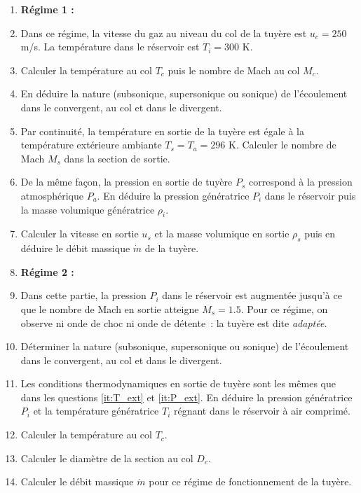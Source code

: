 \begin{enumerate}
\setcounter{enumi}{0}
\item[]
\textbf{R\'egime 1 :}
\item[]
Dans ce r\'egime, la vitesse du gaz au niveau du col de la tuy\`ere
est $u_c = 250$ m/s.
La temp\'erature dans le r\'eservoir est $T_i = 300$ K.
\item
Calculer la temp\'erature au col $T_c$
puis le nombre de Mach au col $M_c$.
\item
En d\'eduire la nature (subsonique, supersonique ou sonique)
de l'\'ecoulement dans le convergent, au col et dans le divergent.
\item
\label{it:T_ext}
Par continuit\'e, la temp\'erature en sortie de la tuy\`ere est \'egale
\`a la temp\'erature ext\'erieure ambiante $T_s = T_a = 296$ K.
Calculer le nombre de Mach $M_s$ dans la section de sortie.
\item
\label{it:P_ext}
De la m\^eme fa\c{c}on, la pression en sortie de tuy\`ere $P_s$ correspond
\`a la pression atmosph\'erique $P_a$.
En d\'eduire la pression g\'en\'eratrice $P_i$ dans le r\'eservoir
puis la masse volumique g\'en\'eratrice $\rho_i$.
\item
Calculer la vitesse en sortie $u_s$ et la masse volumique en sortie $\rho_s$
puis en d\'eduire le d\'ebit massique $\dot{m}$ de la tuy\`ere.
\item[]
\textbf{R\'egime 2 :}
\item[]
Dans cette partie, la pression $P_i$ dans le r\'eservoir est augment\'ee
jusqu'\`a ce que le nombre de Mach en sortie atteigne $M_s = 1.5$.
Pour ce r\'egime, on observe ni onde de choc ni onde de d\'etente~:
la tuy\`ere est dite \textit{adapt\'ee}.
\item
D\'eterminer la nature (subsonique, supersonique ou sonique)
de l'\'ecoulement dans le convergent, au col et dans le divergent.
\item
Les conditions thermodynamiques en sortie de tuy\`ere sont les m\^emes
que dans les questions \ref{it:T_ext} et \ref{it:P_ext}.
En d\'eduire la pression g\'en\'eratrice $P_i$ et la temp\'erature
g\'en\'eratrice $T_i$ r\'egnant dans le r\'eservoir \`a air comprim\'e.
\item
	Calculer la temp\'erature au col $T_c$.
\item
	Calculer le diam\`etre de la section au col $D_c$.
\item
	Calculer le d\'ebit massique $\dot{m}$ pour ce r\'egime de fonctionnement de la tuy\`ere.
\end{enumerate}

